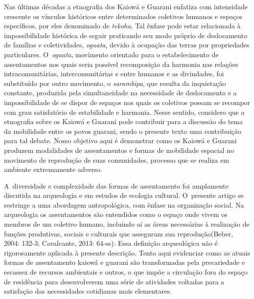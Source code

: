 Nas últimas décadas a etnografia dos Kaiowá e Guarani enfatiza com
intensidade crescente os vínculos históricos entre determinados
coletivos humanos e espaços específicos, por eles denominado de \emph{tekoha}.
Tal ênfase pode estar relacionada à impossibilidade histórica de seguir
praticando seu modo próprio de deslocamento de famílias e
coletividades, \emph{oguata}, devido à ocupação das terras por propriedades
particulares. O~\emph{oguata}, movimento orientado para o estabelecimento de
assentamentos nos quais seria possível recomposição da harmonia nas
relações intracomunitárias, intercomunitárias e entre humanos e as
divindades, foi substituído por outro movimento, o \emph{sarambipa}, que
resulta da inquietação constante, produzida pela simultaneidade na
necessidade de deslocamento e a impossibilidade de se dispor de espaços
nos quais os coletivos possam se recompor com grau satisfatório de
estabilidade e harmonia. Nesse sentido, considero que a etnografia
sobre os Kaiowá e Guarani pode contribuir para a discussão do tema da
mobilidade entre os povos guarani, sendo o presente texto uma
contribuição para tal debate. Nosso objetivo aqui é demonstrar como os
Kaiowá e Guarani produzem modalidades de assentamentos e formas de
mobilidade espacial no movimento de reprodução de suas comunidades,
processo que se realiza em ambiente extremamente adverso.

A~diversidade e complexidade das formas de assentamento foi amplamente
discutida na arqueologia e em estudos de ecologia cultural. O~presente
artigo se restringe a uma abordagem antropológica, com ênfase na
organização social. Na arqueologia os assentamentos são entendidos como
o espaço onde vivem os membros de um coletivo humano, incluindo aí as
áreas necessárias à realização de funções produtivas, sociais e
culturais que asseguram sua reprodução(Beber, 2004: 132-3; 
Cavalcante, 2013: 64-ss). Essa definição
arqueológica não é rigorosamente aplicada à presente descrição. Tento
aqui evidenciar como as atuais formas de assentamento kaiowá e guarani
são transformadas pela precariedade e escassez de recursos ambientais e
outros, o que impõe a circulação fora do espaço de residência para
desenvolverem uma série de atividades voltadas para a satisfação das
necessidades cotidianas mais elementares. 


